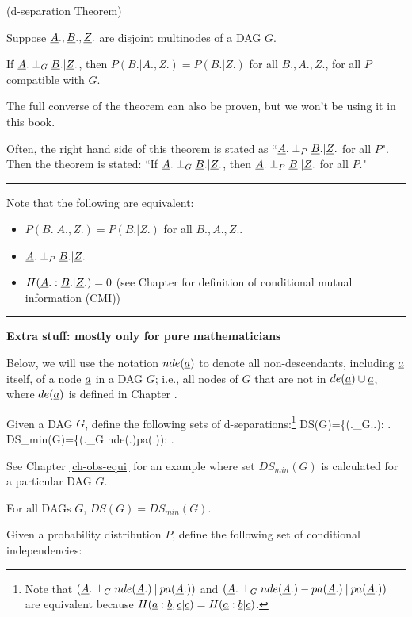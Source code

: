 \begin{claim}(d-separation Theorem)

Suppose
${\underline{A}}., {\underline{B}}., {\underline{Z}}.$
are disjoint multinodes
of a DAG  $G$.

If 
${\underline{A}}.\perp_G {\underline{B}}.|{\underline{Z}}.$, then
$P(B.|A., Z.)=P(B.|Z.)$
for all $B.,A., Z.$,
for all $P$
compatible with $G$.

\end{claim}
The full converse
of the theorem can also be 
proven, 
but we won't be using it
in this book.

Often, the right hand side
of this theorem is stated as 
``${\underline{A}}.\perp_P {\underline{B}}.|{\underline{Z}}.$
for all $P$".
Then the theorem is stated:
``If 
${\underline{A}}.\perp_G {\underline{B}}.|{\underline{Z}}.$, then
${\underline{A}}.\perp_P {\underline{B}}.|{\underline{Z}}.$ for all $P$."  

\hrule
Note that 
the following are equivalent:
\begin{itemize}
\item
$P(B.|A., Z.)=P(B.|Z.)$ for all $B., A., Z.$.
\item
${\underline{A}}.\perp_P {\underline{B}}.|{\underline{Z}}.$
\item
$H({\underline{A}}.:{\underline{B}}.|{\underline{Z}}.)=0$
(see Chapter 
for definition of
 conditional mutual information (CMI))
\end{itemize}
\hrule\noindent
{\bf Extra stuff: mostly only for 
 pure mathematicians}

Below, we will use
the notation $nde({\underline{a}})$
to denote
all non-descendants,
including ${\underline{a}}$ itself, 
of a node ${\underline{a}}$
in a DAG $G$; i.e.,
all nodes of $G$ that are not
in $de({\underline{a}})\cup {\underline{a}}$, where
$de({\underline{a}})$
is defined in Chapter .

Given a DAG $G$, define 
the following
sets of d-separations:\footnote{
Note that
$({\underline{A}}.\perp_G
nde({\underline{A}}.){\:\mathbf{|}\:} pa({\underline{A}}.))$ and
$({\underline{A}}.\perp_G
nde({\underline{A}}.)-pa({\underline{A}}.){\:\mathbf{|}\:} pa({\underline{A}}.))$
are
equivalent
because
$H({\underline{a}}:{\underline{b}}, {\underline{c}}|{\underline{c}})=
H({\underline{a}}:{\underline{b}}|{\underline{c}})$.
}
\beq
DS(G)=\{(\rvA.\perp_G\rvB.\cond\rvZ.):
\;.
\eeq
\beq
DS_{min}(G)=\{(\rvA.\perp_G
nde(\rvA.)\cond pa(\rvA.)):
\;.
\eeq

See Chapter \ref{ch-obs-equi}
for an example
where set $DS_{min}(G)$
is calculated for 
a particular DAG $G$.

\begin{claim}
For all DAGs $G$, $DS(G)=DS_{min}(G)$.
\end{claim}

Given a probability distribution  $P$, 
define the following
set of conditional independencies:

